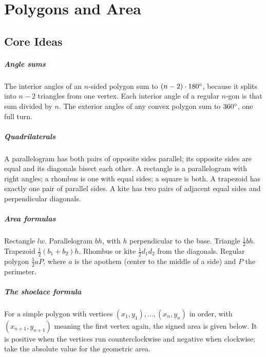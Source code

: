 \chapter{Polygons and Area}


\section{Core Ideas}

\paragraph{Angle sums} The interior angles of an $n$-sided polygon sum to $(n - 2) \cdot 180^\circ$, because it splits into $n - 2$ triangles from one vertex. Each interior angle of a regular $n$-gon is that sum divided by $n$. The exterior angles of any convex polygon sum to $360^\circ$, one full turn.

\paragraph{Quadrilaterals} A parallelogram has both pairs of opposite sides parallel; its opposite sides are equal and its diagonals bisect each other. A rectangle is a parallelogram with right angles; a rhombus is one with equal sides; a square is both. A trapezoid has exactly one pair of parallel sides. A kite has two pairs of adjacent equal sides and perpendicular diagonals.

\paragraph{Area formulas} Rectangle $lw$. Parallelogram $bh$, with $h$ perpendicular to the base. Triangle $\tfrac{1}{2}bh$. Trapezoid $\tfrac{1}{2}(b_1 + b_2)h$. Rhombus or kite $\tfrac{1}{2}d_1 d_2$ from the diagonals. Regular polygon $\tfrac{1}{2}aP$, where $a$ is the apothem (center to the middle of a side) and $P$ the perimeter.

\paragraph{The shoelace formula} For a simple polygon with vertices $(x_1, y_1), \ldots, (x_n, y_n)$ in order, with $(x_{n+1}, y_{n+1})$ meaning the first vertex again, the signed area is given below. It is positive when the vertices run counterclockwise and negative when clockwise; take the absolute value for the geometric area.

